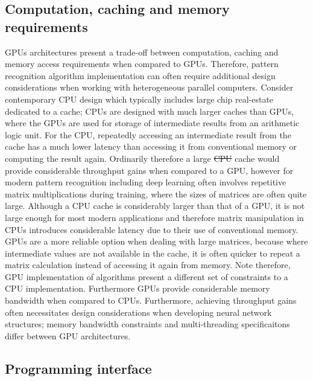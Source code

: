 \documentclass[10pt]{article}[draft]
\begin{document}
\subsection{Computation, caching and memory requirements}
GPUs architectures present a trade-off between computation, caching and memory access requirements when compared to GPUs. Therefore, pattern recognition algorithm implementation can often require additional design considerations when working with heterogeneous parallel computers. Consider contemporary CPU design which typically includes  large chip real-estate dedicated to a cache; CPUs are designed with much larger caches than GPUs, where the GPUs are used for storage of intermediate results from an arithmetic logic unit. For the CPU, repeatedly accessing an intermediate result from the cache has a much lower latency than accessing it from conventional memory or computing the result again. Ordinarily therefore a large \st{CPU} cache would provide considerable throughput gains when compared to a GPU, however for modern pattern recognition including deep learning often involves repetitive matrix multiplications during training, where the sizes of  matrices are often quite large. Although a CPU cache is considerably larger than that of a GPU, it is not large enough for most modern applications and therefore matrix manipulation in CPUs introduces considerable latency due to their use of conventional memory. GPUs are a more reliable option when dealing with large matrices,  because where intermediate values are not available in the cache, it is  often quicker to repeat  a matrix calculation instead of accessing it again from memory. Note therefore, GPU implementation of algorithms present a different set of constraints to a CPU implementation.  Furthermore GPUs provide considerable memory bandwidth when compared to CPUs. Furthermore, achieving throughput gains often necessitates design considerations when developing  neural network structures;  memory bandwidth constraints and multi-threading specificaitons differ between GPU architectures.

\subsection{Programming interface}
\end{document}
